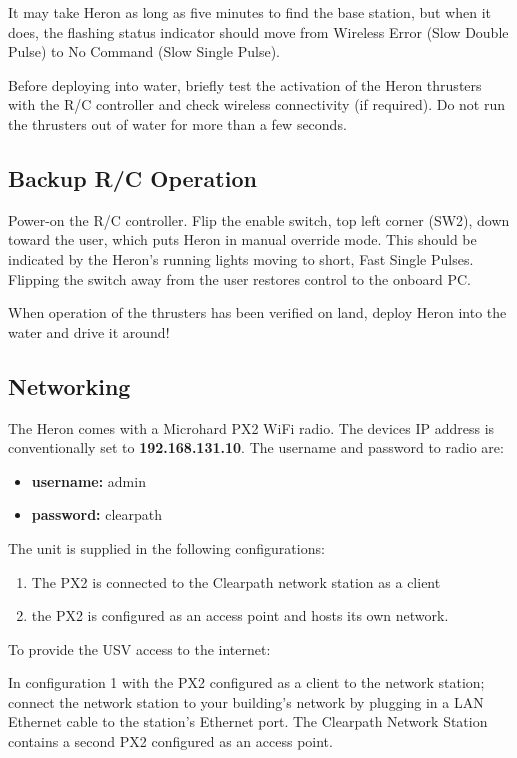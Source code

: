 \documentclass[]{clearpath-latex/clearpath-manual}
\begin{document}
It may take Heron as long as five minutes to find the base station, but when it does, the flashing status indicator should move from Wireless Error (Slow Double Pulse) to No Command (Slow Single Pulse).

Before deploying into water, briefly test the activation of the Heron thrusters with the R/C controller and check wireless connectivity (if required). Do not run the thrusters out of water for more than a few seconds.

\subsection{Backup R/C Operation} \label{backupoperation}
Power-on the R/C controller. Flip the enable switch, top left corner (SW2), down toward the user, which puts Heron in manual override mode. This should be indicated by the Heron's running lights moving to short, Fast Single Pulses. Flipping the switch away from the user restores control to the onboard PC.

When operation of the thrusters has been verified on land, deploy Heron into the water and drive it around!

\subsection{Networking}

The Heron comes with a Microhard PX2 WiFi radio. The devices IP address is conventionally set to \textbf{192.168.131.10}.
The username and password to radio are:
\begin{itemize}
\item \textbf{username:} admin
\item \textbf{password:} clearpath
\end{itemize}


 The unit is supplied in the following configurations:

\begin{enumerate}
\item The PX2 is connected to the Clearpath network station as a client
\item the PX2 is configured as an access point and hosts its own network.
\end{enumerate}

To provide the USV access to the internet:

In configuration 1 with the PX2 configured as a client to the network station; connect the network station to your building's network by plugging in a LAN Ethernet cable to the station's Ethernet port. The Clearpath Network Station contains a second PX2 configured as an access point.
\end{document}
